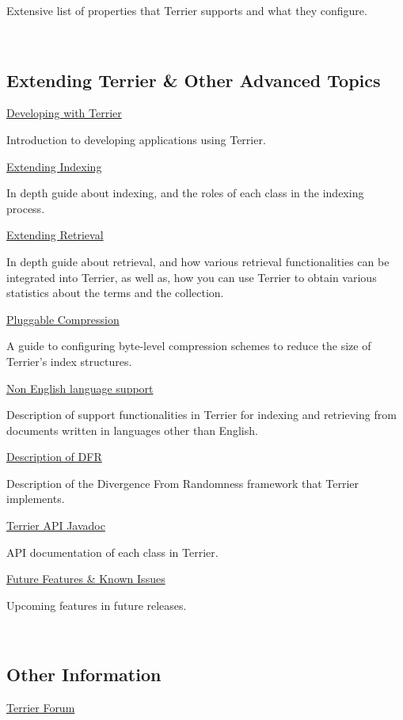 Extensive list of properties that Terrier supports and what they
configure.

~

\subsection{Extending Terrier \& Other Advanced
Topics}\label{extending-terrier-other-advanced-topics}

\href{terrier_develop.html}{Developing with Terrier}

Introduction to developing applications using Terrier.

\href{extend_indexing.html}{Extending Indexing}

In depth guide about indexing, and the roles of each class in the
indexing process.

\href{extend_retrieval.html}{Extending Retrieval}

In depth guide about retrieval, and how various retrieval
functionalities can be integrated into Terrier, as well as, how you can
use Terrier to obtain various statistics about the terms and the
collection.

\href{compression.html}{Pluggable Compression}

A guide to configuring byte-level compression schemes to reduce the size
of Terrier's index structures.

\href{languages.html}{Non English language support}

Description of support functionalities in Terrier for indexing and
retrieving from documents written in languages other than English.

\href{dfr_description.html}{Description of DFR}

Description of the Divergence From Randomness framework that Terrier
implements.

\href{javadoc/index.html}{Terrier API Javadoc}

API documentation of each class in Terrier.

\href{todo.html}{Future Features \& Known Issues}

Upcoming features in future releases.

~

\subsection{Other Information}\label{other-information}

\href{http://terrier.org/forum/}{Terrier Forum}


